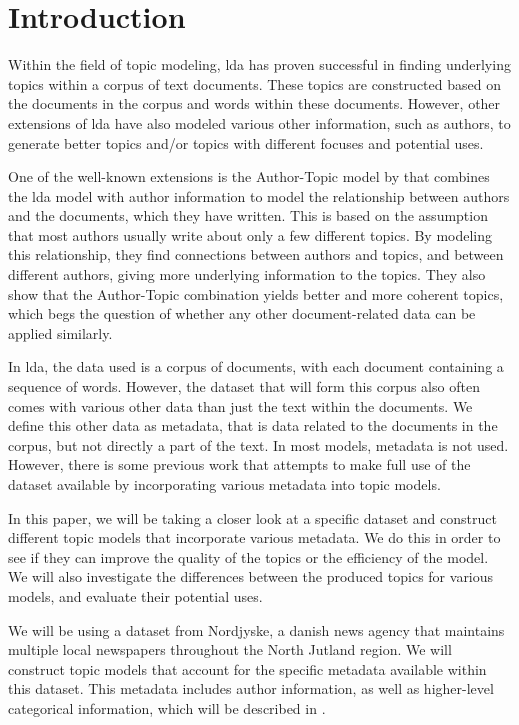 \section{Introduction}\label{sec:introduction}
Within the field of topic modeling, \gls{lda} has proven successful in finding underlying topics within a corpus of text documents.
These topics are constructed based on the documents in the corpus and words within these documents. 
However, other extensions of \gls{lda} have also modeled various other information, such as authors, to generate better topics and/or topics with different focuses and potential uses.

One of the well-known extensions is the Author-Topic model by \citet{author_topic} that combines the \gls{lda} model with author information to model the relationship between authors and the documents, which they have written.
This is based on the assumption that most authors usually write about only a few different topics.
By modeling this relationship, they find connections between authors and topics, and between different authors, giving more underlying information to the topics.
They also show that the Author-Topic combination yields better and more coherent topics, which begs the question of whether any other document-related data can be applied similarly.

In \gls{lda}, the data used is a corpus of documents, with each document containing a sequence of words.
However, the dataset that will form this corpus also often comes with various other data than just the text within the documents.
We define this other data as metadata, that is data related to the documents in the corpus, but not directly a part of the text.
In most models, metadata is not used.
However, there is some previous work that attempts to make full use of the dataset available by incorporating various metadata into topic models.

In this paper, we will be taking a closer look at a specific dataset and construct different topic models that incorporate various metadata.
We do this in order to see if they can improve the quality of the topics or the efficiency of the model.
We will also investigate the differences between the produced topics for various models, and evaluate their potential uses.

We will be using a dataset from Nordjyske, a danish news agency that maintains multiple local newspapers throughout the North Jutland region.
We will construct topic models that account for the specific metadata available within this dataset.
This metadata includes author information, as well as higher-level categorical information, which will be described in .

